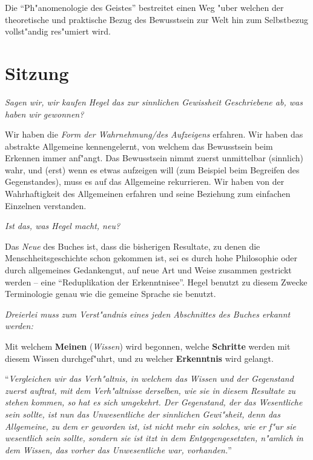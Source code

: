 \documentclass[emulatestandardclasses]{scrartcl}
\begin{document}
Die "`Ph"anomenologie des Geistes"' bestreitet einen Weg "uber welchen der theoretische und praktische Bezug des Bewusstsein zur Welt hin zum Selbstbezug vollst"andig res"umiert wird.



\section*{Sitzung}

\emph{Sagen wir, wir kaufen Hegel das zur sinnlichen Gewissheit Geschriebene ab, was haben wir gewonnen?}

Wir haben die \emph{Form der Wahrnehmung/des Aufzeigens} erfahren. Wir haben das abstrakte Allgemeine kennengelernt, von welchem das Bewusstsein beim Erkennen immer anf"angt. Das Bewusstsein nimmt zuerst unmittelbar (sinnlich) wahr, und (erst) wenn es etwas aufzeigen will (zum Beispiel beim Begreifen des Gegenstandes), muss es auf das Allgemeine rekurrieren. Wir haben von der Wahrhaftigkeit des Allgemeinen erfahren und seine Beziehung zum einfachen Einzelnen verstanden.\newline

\noindent \emph{Ist das, was Hegel macht, \emph{neu}?}

Das \emph{Neue} des Buches ist, dass die bisherigen Resultate, zu denen die Menschheitsgeschichte schon gekommen ist, sei es durch hohe Philosophie oder durch allgemeines Gedankengut, auf neue Art und Weise zusammen gestrickt werden -- eine "`Reduplikation der Erkenntnisee"'. Hegel benutzt zu diesem Zwecke Terminologie genau wie die gemeine Sprache sie benutzt.\newline

\noindent \emph{Dreierlei muss zum Verst"andnis eines jeden Abschnittes des Buches erkannt werden:} 

Mit welchem \textbf{Meinen} (\emph{Wissen}) wird begonnen, welche \textbf{Schritte} werden mit diesem Wissen durchgef"uhrt, und zu welcher \textbf{Erkenntnis} wird gelangt.\newline

"`\emph{Vergleichen wir das Verh"altnis, in welchem das Wissen und der Gegenstand zuerst auftrat, mit dem Verh"altnisse derselben, wie sie in diesem Resultate zu stehen kommen, so hat es sich umgekehrt. Der Gegenstand, der das Wesentliche sein sollte, ist nun das Unwesentliche der sinnlichen Gewi"sheit, denn das Allgemeine, zu dem er geworden ist, ist nicht mehr ein solches, wie er f"ur sie wesentlich sein sollte, sondern sie ist itzt in dem Entgegengesetzten, n"amlich in dem Wissen, das vorher das Unwesentliche war, vorhanden.}"'\newline
\end{document}
